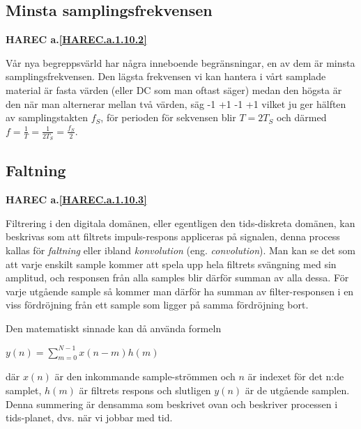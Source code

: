 \subsection{Minsta samplingsfrekvensen}
\textbf{HAREC a.\ref{HAREC.a.1.10.2}\label{myHAREC.a.1.10.2}}


Vår nya begreppsvärld har några inneboende begränsningar, en av dem är minsta
samplingsfrekvensen.
Den lägsta frekvensen vi kan hantera i vårt samplade material är fasta värden
(eller DC som man oftast säger) medan den högsta är den när man alternerar
mellan två värden, säg -1 +1 -1 +1 vilket ju ger hälften av samplingstakten
\(f_S\), för perioden för sekvensen blir \(T = 2T_S\) och därmed
\(f=\frac{1}{T}=\frac{1}{2T_S}=\frac{f_S}{2}\).

\subsection{Faltning}
\textbf{HAREC a.\ref{HAREC.a.1.10.3}\label{myHAREC.a.1.10.3}}

Filtrering i den digitala domänen, eller egentligen den tids-diskreta domänen,
kan beskrivas som att filtrets impuls-respons appliceras på signalen, denna
process kallas för \emph{faltning} eller ibland \emph{konvolution} (eng.
\emph{convolution}).
Man kan se det som att varje enskilt sample kommer att spela upp hela filtrets
svängning med sin amplitud, och responsen från alla samples blir därför summan
av alla dessa.
För varje utgående sample så kommer man därför ha summan av filter-responsen
i en viss fördröjning från ett sample som ligger på samma fördröjning bort.

Den matematiskt sinnade kan då använda formeln

\(y(n) = \sum_{m=0}^{N-1} x(n-m)h(m)\)

där \(x(n)\) är den inkommande sample-strömmen och \(n\) är indexet för det
n:de samplet, \(h(m)\) är filtrets respons och slutligen \(y(n)\) är de utgående
samplen.
Denna summering är densamma som beskrivet ovan och beskriver processen
i tids-planet, dvs. när vi jobbar med tid.

